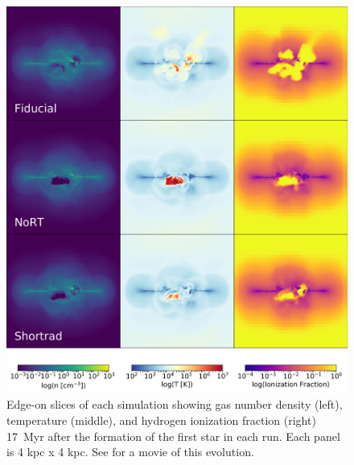 \begin{figure}
\centering
\includegraphics[width=0.99\linewidth]{figures/ch2/DD0136_fiducial_shortrad_nort}
\caption{Edge-on slices of each simulation showing gas number density (left), temperature (middle), and hydrogen ionization fraction (right) 17~Myr after the formation of the first star in each run. Each panel is 4 kpc x 4 kpc.
See \cite{Emerick2018a} for a movie of this evolution.}
\label{ch2:fig:panel1}
\end{figure}

